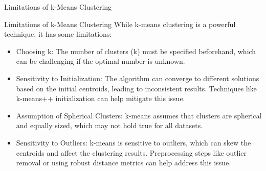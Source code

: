 \documentclass[hyperref={pdfpagelabels=false},aspectratio=169]{beamer}
\begin{document}
\begin{frame}[label={sec:orgb9b237e}]{Limitations of k-Means Clustering}
\begin{block}{Limitations of k-Means Clustering}
\pause
While k-means clustering is a powerful technique, it has some limitations:
\begin{itemize}[<+->]
\item \alert{\alert{Choosing k}}: The number of clusters (k) must be specified beforehand, which can be challenging if the optimal number is unknown.
\item \alert{\alert{Sensitivity to Initialization}}: The algorithm can converge to different solutions based on the initial centroids, leading to inconsistent results. Techniques like k-means++ initialization can help mitigate this issue.
\item \alert{\alert{Assumption of Spherical Clusters}}: k-means assumes that clusters are spherical and equally sized, which may not hold true for all datasets.
\item \alert{\alert{Sensitivity to Outliers}}: k-means is sensitive to outliers, which can skew the centroids and affect the clustering results. Preprocessing steps like outlier removal or using robust distance metrics can help address this issue.
\end{itemize}
\end{block}
\end{frame}
\end{document}
